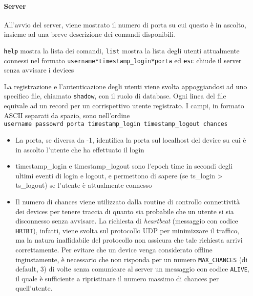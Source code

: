 \documentclass[11pt,a4paper,twocolumn,twoside]{paper}
\begin{document}
\paragraph{Server}
 All'avvio del server, viene mostrato il numero di porta su cui
    questo è in ascolto, insieme ad una breve descrizione dei comandi
    disponibili.

    \texttt{help} mostra la lista dei comandi, \texttt{list} mostra la
    lista degli utenti attualmente connessi nel formato
    \texttt{username*timestamp\_login*porta} ed \texttt{esc} chiude il
    server senza avvisare i devices

    La registrazione e l'autenticazione degli utenti viene svolta
    appoggiandosi ad uno specifico file, chiamato \texttt{shadow}, con
    il ruolo di database. Ogni linea del file equivale ad un record per
    un corrispettivo utente registrato. I campi, in formato ASCII
    separati da spazio, sono nell'ordine
    \texttt{username\ passowrd\ porta\ timestamp\_login\ timestamp\_logout\ chances}
\begin{itemize}[leftmargin=4mm, noitemsep]


	\item La porta, se diversa da -1, identifica la porta sul localhost del
      device su cui è in ascolto l'utente che ha effettuato il login

      \item timestamp\_login e timestamp\_logout sono l'epoch time in
      secondi degli ultimi eventi di login e logout, e permettono di
      sapere (se ts\_login \textgreater{} ts\_logout) se l'utente è
      attualmente connesso

      \item Il numero di chances viene utilizzato dalla routine di controllo
      connettività dei devices per tenere traccia di quanto sia
      probabile che un utente si sia disconnesso senza avvisare. La
      richiesta di \emph{heartbeat} (messaggio con codice
      \texttt{HRTBT}), infatti, viene svolta sul protocollo UDP per
      minimizzare il traffico, ma la natura inaffidabile del protocollo
      non assicura che tale richiesta arrivi correttamente. Per evitare
      che un device venga considerato offline ingiustamente, è
      necessario che non risponda per un numero \texttt{MAX\_CHANCES}
      (di default, 3) di volte senza comunicare al server un messaggio
      con codice \texttt{ALIVE}, il quale è sufficiente a ripristinare
      il numero massimo di chances per quell'utente.
\end{itemize}
\end{document}

